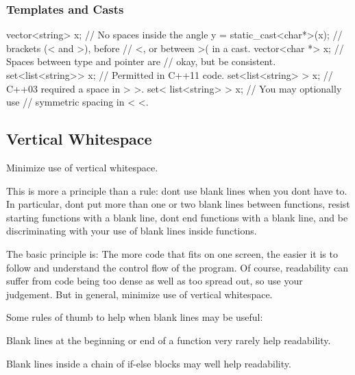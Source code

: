 \subsubsection*{Templates and Casts}


\begin{DoxyCode}
vector<string> x;           \textcolor{comment}{// No spaces inside the angle}
y = \textcolor{keyword}{static\_cast<}\textcolor{keywordtype}{char}*\textcolor{keyword}{>}(x);  \textcolor{comment}{// brackets (< and >), before}
                            \textcolor{comment}{// <, or between >( in a cast.}
vector<char *> x;           \textcolor{comment}{// Spaces between type and pointer are}
                            \textcolor{comment}{// okay, but be consistent.}
set<list<string>> x;        \textcolor{comment}{// Permitted in C++11 code.}
set<list<string> > x;       \textcolor{comment}{// C++03 required a space in > >.}
set< list<string> > x;      \textcolor{comment}{// You may optionally use}
                            \textcolor{comment}{// symmetric spacing in < <.}
\end{DoxyCode}


\subsection*{Vertical Whitespace}

Minimize use of vertical whitespace.

This is more a principle than a rule\+: don\textquotesingle{}t use blank lines when you don\textquotesingle{}t have to. In particular, don\textquotesingle{}t put more than one or two blank lines between functions, resist starting functions with a blank line, don\textquotesingle{}t end functions with a blank line, and be discriminating with your use of blank lines inside functions.

The basic principle is\+: The more code that fits on one screen, the easier it is to follow and understand the control flow of the program. Of course, readability can suffer from code being too dense as well as too spread out, so use your judgement. But in general, minimize use of vertical whitespace.

Some rules of thumb to help when blank lines may be useful\+:


\begin{DoxyItemize}
\item Blank lines at the beginning or end of a function very rarely help readability.
\item Blank lines inside a chain of if-\/else blocks may well help readability.
\end{DoxyItemize}

